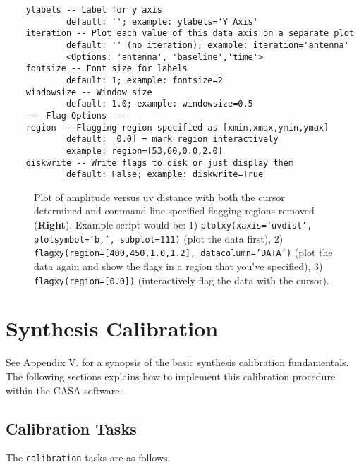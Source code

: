 \begin{verbatim}
    ylabels -- Label for y axis
            default: ''; example: ylabels='Y Axis'
    iteration -- Plot each value of this data axis on a separate plot
            default: '' (no iteration); example: iteration='antenna'
            <Options: 'antenna', 'baseline','time'>
    fontsize -- Font size for labels
            default: 1; example: fontsize=2
    windowsize -- Window size
            default: 1.0; example: windowsize=0.5
    --- Flag Options ---
    region -- Flagging region specified as [xmin,xmax,ymin,ymax]
            default: [0.0] = mark region interactively
            example: region=[53,60,0.0,2.0]
    diskwrite -- Write flags to disk or just display them
            default: False; example: diskwrite=True
\end{verbatim}
\normalsize

\begin{figure}[h!]
\caption{\label{fig:markflags} Plot of amplitude versus
uv distance with both the cursor determined and command line
specified flagging regions removed ({\bf Right}). Example script would
be: 
1) {\tt plotxy(xaxis='uvdist', plotsymbol='b,', subplot=111)} (plot
   the data first), 
2) {\tt flagxy(region=[400,450,1.0,1.2], datacolumn='DATA')}
   (plot the data again and show the flags in a region that you've
   specified), 
3) {\tt flagxy(region=[0.0])} (interactively flag the data with
   the cursor).}
\hrulefill
\end{figure}



\chapter{Synthesis Calibration}
\label{chapter:synth.calib}

See Appendix V. for a synopsis of the basic synthesis calibration
fundamentals.  The following sections explains how to implement this
calibration procedure within the CASA software.  


\section{Calibration Tasks}

The {\tt calibration} tasks are as follows:

